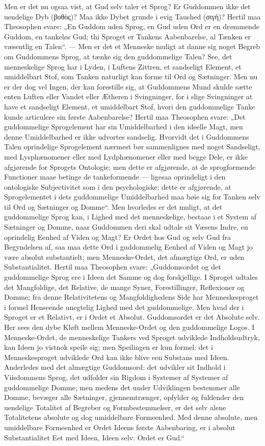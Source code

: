 \documentclass[12pt]{book}
\newcommand{\opage}[1]{\marginnote{\footnotesize\textit{[#1]}}}
\begin{document}
Men er det nu ogsaa vist, at Gud selv taler et Sprog?
Er Guddommen ikke det uendelige Dyb (βυθὸς)? Maa ikke
Dybet grunde i evig Taushed (σιγὴ)? Hertil maa Theosophen
svare: „En Guddom uden Sprog, en Gud uden Ord er en
drømmende Guddom, en tankeløs Gud; thi Sproget er Tankens
Aabenbarelse, al Tænken er væsentlig en Talen“. --- Men
er det et Menneske muligt at danne sig noget Begreb om
Guddommens Sprog, at tænke sig den guddommelige Talen?
See, det menneskelige Sprog har i Lyden, i Luftens Zittren,
et sandseligt Element, et umiddelbart Stof, som Tanken
naturligt kan forme til Ord og Sætninger. Men nu er der
dog vel Ingen, der kan forestille sig, at Guddommens Mund
skulde sætte enten Luften eller Vandet eller Ætheren i Svingninger,
for i slige Svingninger at have et sandseligt Element,
et umiddelbart Stof, hvori den guddommelige Tanke kunde
articulere sin første Aabenbarelse? Hertil maa Theosophen
svare: „Det guddommelige Sprogelement har sin Umiddelbarhed
i den ideelle Magt, men denne Umiddelbarhed er ikke
udvortes sandselig. Hvorvidt det i Guddommens Talen oprindelige
Sprogelement nærmest bør sammenlignes med noget
Sandseligt, med Lysphænomener eller med Lydphænomener eller
med begge Dele, er ikke afgjørende for Sprogets Ontologie;
\opage{88}men dette er afgjørende, at de sprogformende Functioner maae
betinge de tankeformende --- ligesaa oprindeligt i den ontologiske
Subjectivitet som i den psychologiske; dette er afgjørende, at
Sprogelementet i dets guddommelige Umiddelbarhed maa
bøie sig for Tanken selv til Ord og Sætninger og Domme“.
Men hvorledes er det muligt, at det guddommelige Sprog kan,
i Lighed med det menneskelige, bestaae i et System af Sætninger
og Domme, naar Guddommen deri skal udtale sit
Væsens Indre, en oprindelig Eenhed af Viden og Magt?
Er Ordet hos Gud og selv Gud fra Begyndelsen af, saa
maa dette Ord i guddommelig Eenhed af Viden og Magt jo
være absolut substantielt; men Menneske-Ordet, det afmægtige
Ord, er uden Substantialitet. Hertil maa Theosophen svare:
„Guddomsordet og det guddommelige Sprog ere i Ideen det
Samme og dog forskjellige. I Sproget udtales det Mangfoldige,
det Relative, de mange Syner, Forestillinger, Reflexioner
og Domme; fra denne Relativitetens og Mangfoldighedens
Side har Menneskesproget i formel Henseende unegtelig
Lighed med det guddommelige. Men hvad der i Sproget er
et Relativt, er i Ordet et Absolut. Guddomsordet er det
Absolute selv. Her sees den dybe Kløft mellem Menneske-Ordet
og den guddommelige Logos. I Menneske-Ordet, de
menneskelige Tankers ved Sproget udviklede Indholdsudtryk,
kan Ideen jo vistnok speile sig; men Speilingen er kun formel:
det i Menneskesproget udviklede Ord kan ikke blive een
Substans med Ideen. Anderledes med det almægtige Guddomsord:
det udvikler sit Indhold i Viisdommens Sprog,
det udfolder sin Rigdom i Systemer af Systemer af guddommelige
Domme; men medens det under Udviklingen bestemmer
alle Domme, bevæger alle Sætninger, gjennemtrænger,
opfylder og fuldender den uendelige Totalitet af Begreber og
Formbestemmelser, er det selv alene Totalitetens absolute og
dog umiddelbare Formeenhed. Med denne absolute, men
umiddelbare Formeenhed er Ordet Ideens første Aabenbaring,
\opage{89}er i absolut Substantialitet Eet med Ideen, Ideen selv: Ordet
er Gud.“
\end{document}
